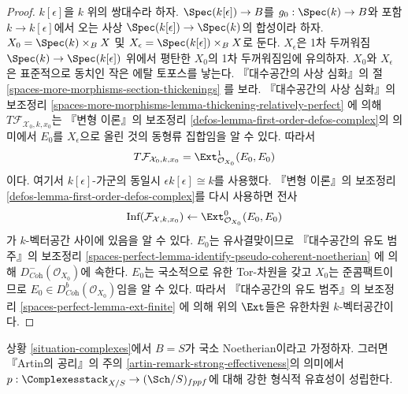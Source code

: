 \begin{proof}
\medskip\noindent
$k[\epsilon]$을 $k$ 위의 쌍대수라 하자. $\Spec(k[\epsilon]) \to B$를
$g_0 : \Spec(k) \to B$와 포함 $k \to k[\epsilon]$에서 오는 사상
$\Spec(k[\epsilon]) \to \Spec(k)$의 합성이라 하자.
$X_0 = \Spec(k) \times_B X$ 및
$X_\epsilon = \Spec(k[\epsilon]) \times_B X$로 둔다. $X_\epsilon$은 1차
두꺼워짐 $\Spec(k) \to \Spec(k[\epsilon])$ 위에서 평탄한 $X_0$의 1차
두꺼워짐임에 유의하자. $X_0$와 $X_\epsilon$은 표준적으로 동치인 작은 에탈
토포스를 낳는다. 『대수공간의 사상 심화』의 절
\ref{spaces-more-morphisms-section-thickenings}
를 보라. 『대수공간의 사상 심화』의 보조정리
\ref{spaces-more-morphisms-lemma-thickening-relatively-perfect}
에 의해 $T\mathcal{F}_{\mathcal{X}_0, k, x_0}$는 『변형 이론』의 보조정리
\ref{defos-lemma-first-order-defos-complex}의 의미에서 $E_0$를
$X_\epsilon$으로 올린 것의 동형류 집합임을 알 수 있다. 따라서
$$
T\mathcal{F}_{\mathcal{X}_0, k, x_0} =
\Ext^1_{\mathcal{O}_{X_0}}(E_0, E_0)
$$
이다. 여기서 $k[\epsilon]$-가군의 동일시 $\epsilon k[\epsilon] \cong k$를
사용했다. 『변형 이론』의 보조정리
\ref{defos-lemma-first-order-defos-complex}를 다시 사용하면 전사
$$
\text{Inf}(\mathcal{F}_{\mathcal{X}, k, x_0})
\leftarrow
\Ext^0_{\mathcal{O}_{X_0}}(E_0, E_0)
$$
가 $k$-벡터공간 사이에 있음을 알 수 있다. $E_0$는 유사결맞이므로
『대수공간의 유도 범주』의 보조정리
\ref{spaces-perfect-lemma-identify-pseudo-coherent-noetherian}
에 의해 $D^-_{\textit{Coh}}(\mathcal{O}_{X_0})$에 속한다. $E_0$는 국소적으로
유한 Tor-차원을 갖고 $X_0$는 준콤팩트이므로
$E_0 \in D^b_{\textit{Coh}}(\mathcal{O}_{X_0})$임을 알 수 있다. 따라서
『대수공간의 유도 범주』의 보조정리
\ref{spaces-perfect-lemma-ext-finite}
에 의해 위의 $\Ext$들은 유한차원 $k$-벡터공간이다.
\end{proof}

\begin{lemma}
\label{lemma-complexes-strong-effectiveness}
상황 \ref{situation-complexes}에서 $B = S$가 국소 Noetherian이라고 가정하자.
그러면 『Artin의 공리』의 주의 \ref{artin-remark-strong-effectiveness}의 의미에서
$p : \Complexesstack_{X/S} \to (\Sch/S)_{fppf}$에 대해 강한 형식적 유효성이
성립한다.
\end{lemma}


